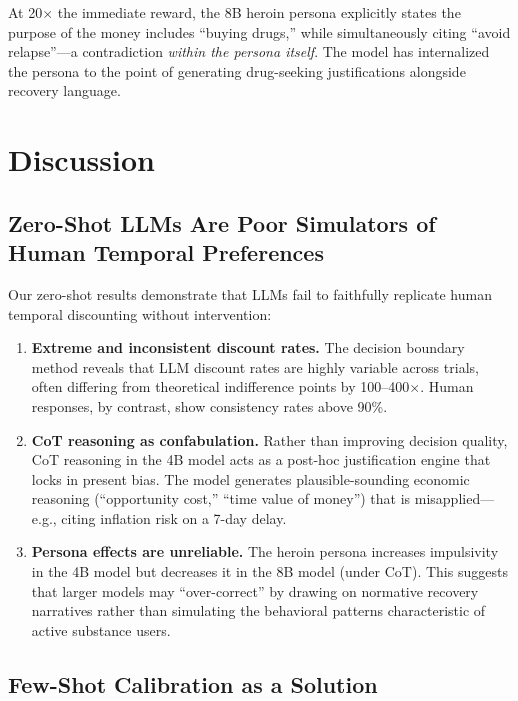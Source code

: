 \documentclass[11pt,a4paper]{article}
\begin{document}
At 20$\times$ the immediate reward, the 8B heroin persona explicitly states the purpose of the money includes ``buying drugs,'' while simultaneously citing ``avoid relapse''---a contradiction \emph{within the persona itself}. The model has internalized the persona to the point of generating drug-seeking justifications alongside recovery language.

\section{Discussion}

\subsection{Zero-Shot LLMs Are Poor Simulators of Human Temporal Preferences}

Our zero-shot results demonstrate that LLMs fail to faithfully replicate human temporal discounting without intervention:

\begin{enumerate}
    \item \textbf{Extreme and inconsistent discount rates.} The decision boundary method reveals that LLM discount rates are highly variable across trials, often differing from theoretical indifference points by 100--400$\times$. Human responses, by contrast, show consistency rates above 90\%.

    \item \textbf{CoT reasoning as confabulation.} Rather than improving decision quality, CoT reasoning in the 4B model acts as a post-hoc justification engine that locks in present bias. The model generates plausible-sounding economic reasoning (``opportunity cost,'' ``time value of money'') that is misapplied---e.g., citing inflation risk on a 7-day delay.

    \item \textbf{Persona effects are unreliable.} The heroin persona increases impulsivity in the 4B model but decreases it in the 8B model (under CoT). This suggests that larger models may ``over-correct'' by drawing on normative recovery narratives rather than simulating the behavioral patterns characteristic of active substance users.
\end{enumerate}

\subsection{Few-Shot Calibration as a Solution}
\end{document}
